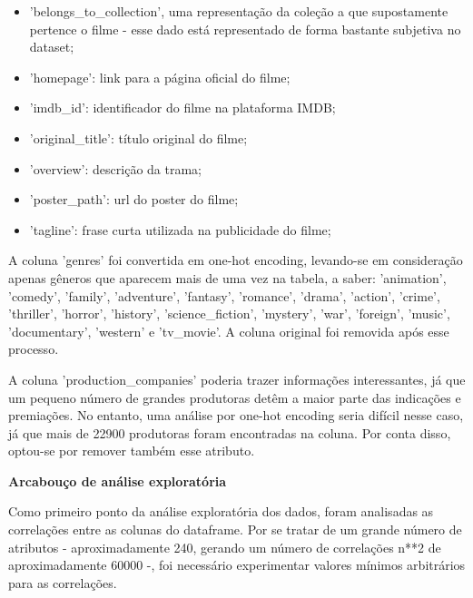             \begin{itemize}
                \item 'belongs\_to\_collection', uma representação da coleção a que supostamente pertence o filme - esse dado está representado de forma bastante subjetiva no dataset;
                \item 'homepage': link para a página oficial do filme;
                \item 'imdb\_id': identificador do filme na plataforma IMDB;
                \item 'original\_title': título original do filme;
                \item 'overview': descrição da trama;
                \item 'poster\_path': url do poster do filme;
                \item 'tagline': frase curta utilizada na publicidade do filme;
            \end{itemize}
            
            A coluna 'genres' foi convertida em one-hot encoding, levando-se em consideração apenas gêneros que aparecem mais de uma vez na tabela, a saber: 'animation', 'comedy', 'family', 'adventure', 'fantasy', 'romance', 'drama', 'action', 'crime', 'thriller', 'horror', 'history', 'science\_fiction', 'mystery', 'war', 'foreign', 'music', 'documentary', 'western' e 'tv\_movie'. A coluna original foi removida após esse processo.
            
            A coluna 'production\_companies' poderia trazer informações interessantes, já que um pequeno número de grandes produtoras detêm a maior parte das indicações e premiações\cite{argon2020}. No entanto, uma análise por one-hot encoding seria difícil nesse caso, já que mais de 22900 produtoras foram encontradas na coluna. Por conta disso, optou-se por remover também esse atributo.\newline
            
            \textbf{Arcabouço de análise exploratória}\par

            Como primeiro ponto da análise exploratória dos dados, foram analisadas as correlações entre as colunas do dataframe. Por se tratar de um grande número de atributos - aproximadamente 240, gerando um número de correlações n**2 de aproximadamente 60000 -, foi necessário experimentar valores mínimos arbitrários para as correlações.

